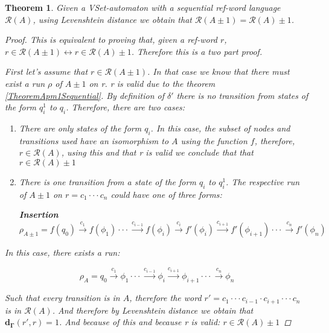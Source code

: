 \documentclass{article}
\newcommand{\lra}{\longrightarrow}
\newtheorem{theorem}{Theorem}
\begin{document}
\begin{theorem} \label{TheoremAutomatonPM1}
    Given a VSet-automaton with a sequential ref-word language
    $\mathcal{R}(A)$, using Levenshtein distance we obtain that
    $\mathcal{R}(A \pm 1) = \mathcal{R}(A) \pm 1$.

    \begin{proof}
	This is equivalent to proving that, given a ref-word $r$,
	$r \in \mathcal{R}(A \pm 1) \leftrightarrow r \in
	\mathcal{R}(A)\pm 1$. Therefore this is a two part proof.

	First let's assume that $r \in \mathcal{R}(A \pm 1)$. In
	that case we know that there must exist a run $\rho$ of $A
    \pm 1$ on r. r is valid due to the theorem \ref{TheoremApm1Sequential}.
    By definition of $\delta'$
	there is no transition from states of the form $q_i^1$ to
	$q_i$.  Therefore, there are two cases:
        \begin{enumerate}
	    \item There are only states of the form $q_i$. In this
            case, the subset of nodes and transitions used have an
            isomorphism to $A$ using the function $f$, therefore,
            $r \in \mathcal{R}(A)$, using this and that r is valid
            we conclude that that$r \in \mathcal{R}(A) \pm 1$
	    \item There is one transition from a state of the form
            $q_i$ to $q_i^1$. The respective run of $A \pm 1$ on
            $r = c_1 \cdot \cdot \cdot c_n$ could have one of three
            forms:

     \textbf{Insertion}
		\begin{equation}
		    \rho_{A\pm 1} = f(q_0) \overset{c_1}{\lra}
		    f(\phi_1) \cdot\cdot\cdot\overset{c_{i-1}}{\lra}
		    f(\phi_i) \overset{c_{i}}{\lra} f'(\phi_i)
		    \overset{c_{i+1}}{\lra} f'(\phi_{i + 1})  \cdot
		    \cdot \cdot \overset{c_n}{\lra} f'(\phi_n)
		\end{equation}
	    \end{enumerate}

    In this case, there exists a run:

	\begin{equation}
	    \rho_{A} = q_0 \overset{c_1}{\lra} \phi_1
	    \cdot\cdot\cdot \overset{c_{i-1}}{\lra}\phi_i
	    \overset{c_{i+1}}{\lra} \phi_{i + 1}  \cdot \cdot \cdot
	    \overset{c_n}{\lra} \phi_n
	\end{equation}

	Such that every transition is in $A$, therefore the word
	$r'=c_1\cdot\cdot\cdot c_{i-1} \cdot c_{i+1} \cdot \cdot\cdot
	c_n$ is in $\mathcal{R}(A)$. And therefore by Levenshtein
	distance we obtain that $\mathbf{d_\Gamma}(r',r) = 1$.
	And because of this and because r is valid: 
    $r \in \mathcal{R}(A) \pm 1$


\end{proof}
\end{theorem}
\end{document}

